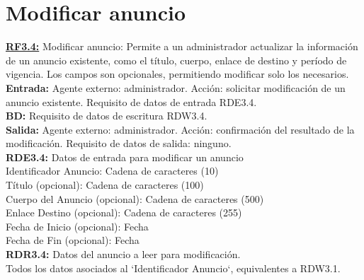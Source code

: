 \section{Modificar anuncio}
\textbf{\textcolor{rojo}{\underline{RF3.4:}}} Modificar anuncio: Permite a un administrador actualizar la información de un anuncio existente, como el título, cuerpo, enlace de destino y período de vigencia. Los campos son opcionales, permitiendo modificar solo los necesarios. \\[6pt]

\textbf{\textcolor{rojo}{Entrada:}} Agente externo: administrador. Acción: solicitar modificación de un anuncio existente. 
Requisito de datos de entrada \textcolor{azul}{RDE3.4}. \\[6pt]

\textbf{\textcolor{rojo}{BD:}} Requisito de datos de escritura \textcolor{azul}{RDW3.4}. \\[6pt]

\textbf{\textcolor{rojo}{Salida:}} Agente externo: administrador. Acción: confirmación del resultado de la modificación. 
Requisito de datos de salida: ninguno. \\[12pt]

\textcolor{azul}{\textbf{RDE3.4:}} Datos de entrada para modificar un anuncio \\
\hspace*{1cm} Identificador Anuncio: Cadena de caracteres (10) \\
\hspace*{1cm} Título (opcional): Cadena de caracteres (100) \\
\hspace*{1cm} Cuerpo del Anuncio (opcional): Cadena de caracteres (500) \\
\hspace*{1cm} Enlace Destino (opcional): Cadena de caracteres (255) \\
\hspace*{1cm} Fecha de Inicio (opcional): Fecha \\
\hspace*{1cm} Fecha de Fin (opcional): Fecha \\[12pt]

\textcolor{azul}{\textbf{RDR3.4:}} Datos del anuncio a leer para modificación. \\
\hspace*{1cm} Todos los datos asociados al `Identificador Anuncio`, equivalentes a RDW3.1. \\[12pt]

